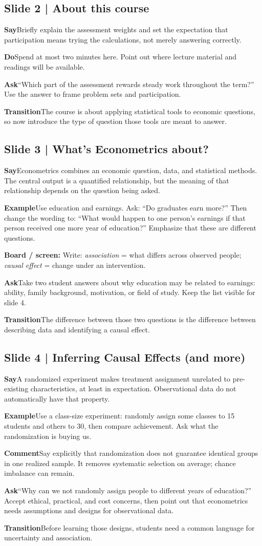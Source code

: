 \documentclass[11pt,a4paper]{article}
\newcommand{\slideheading}[1]{\subsection*{\color{accent}#1}}
\newcommand{\cue}[2]{\par\noindent\textbf{#1}\quad #2\par}
\newcommand{\board}[1]{\par\noindent\colorbox{soft}{\parbox{0.96\textwidth}{\textbf{Board / screen:} #1}}\par}
\begin{document}
\slideheading{Slide 2 | About this course}
\cue{Say}{Briefly explain the assessment weights and set the expectation that participation means trying the calculations, not merely answering correctly.}
\cue{Do}{Spend at most two minutes here. Point out where lecture material and readings will be available.}
\cue{Ask}{``Which part of the assessment rewards steady work throughout the term?'' Use the answer to frame problem sets and participation.}
\cue{Transition}{The course is about applying statistical tools to economic questions, so now introduce the type of question those tools are meant to answer.}

\slideheading{Slide 3 | What's Econometrics about?}
\cue{Say}{Econometrics combines an economic question, data, and statistical methods. The central output is a quantified relationship, but the meaning of that relationship depends on the question being asked.}
\cue{Example}{Use education and earnings. Ask: ``Do graduates earn more?'' Then change the wording to: ``What would happen to one person's earnings if that person received one more year of education?'' Emphasize that these are different questions.}
\board{Write: \textit{association} = what differs across observed people; \quad \textit{causal effect} = change under an intervention.}
\cue{Ask}{Take two student answers about why education may be related to earnings: ability, family background, motivation, or field of study. Keep the list visible for slide 4.}
\cue{Transition}{The difference between those two questions is the difference between describing data and identifying a causal effect.}

\slideheading{Slide 4 | Inferring Causal Effects (and more)}
\cue{Say}{A randomized experiment makes treatment assignment unrelated to pre-existing characteristics, at least in expectation. Observational data do not automatically have that property.}
\cue{Example}{Use a class-size experiment: randomly assign some classes to 15 students and others to 30, then compare achievement. Ask what the randomization is buying us.}
\cue{Comment}{Say explicitly that randomization does not guarantee identical groups in one realized sample. It removes systematic selection on average; chance imbalance can remain.}
\cue{Ask}{``Why can we not randomly assign people to different years of education?'' Accept ethical, practical, and cost concerns, then point out that econometrics needs assumptions and designs for observational data.}
\cue{Transition}{Before learning those designs, students need a common language for uncertainty and association.}
\end{document}

